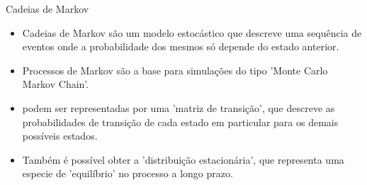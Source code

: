 \documentclass{beamer}
\begin{document}
\begin{frame}{Cadeias de Markov}
\begin{itemize}

\item Cadeias de Markov são um modelo estocástico que descreve uma sequência de eventos onde a probabilidade dos mesmos só depende do estado anterior.


\item Processos de Markov são a base para simulações do tipo 'Monte Carlo Markov Chain'.


\item podem ser representadas por uma 'matriz de transição', que descreve as probabilidades de transição de cada estado em particular para os demais possíveis estados.


\item Também é possível obter a 'distribuição estacionária', que representa uma especie de 'equilíbrio' no processo a longo prazo.


    
    

\end{itemize}
\end{frame}
\end{document}
